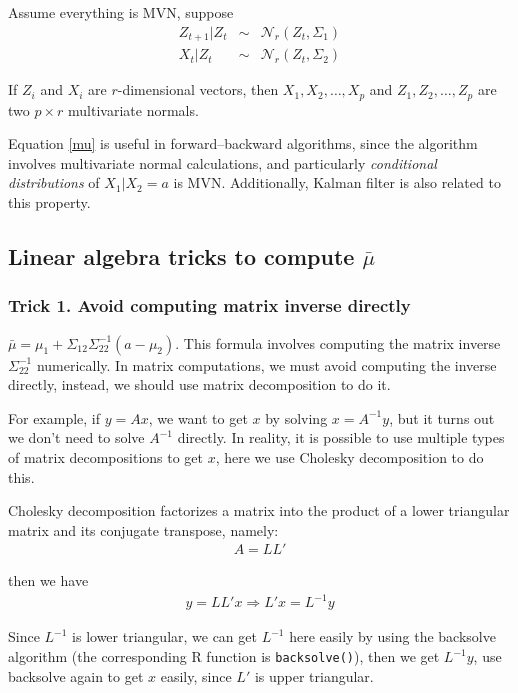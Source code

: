 \documentclass[12pt]{report}
\begin{document}
Assume everything is MVN, suppose
\begin{eqnarray}
Z_{t+1} | Z_t & \sim & \mathcal{N}_{r} (Z_t, \Sigma_1)\\
X_{t} | Z_t & \sim & \mathcal{N}_{r} (Z_t, \Sigma_2)
\end{eqnarray}

If $Z_i$ and $X_i$ are $r$-dimensional vectors, then $X_1, X_2, \ldots, X_p$ and $Z_1, Z_2, \ldots, Z_p$ are two $p \times r$ multivariate normals.

\vskip 0.1in

Equation \ref{mu} is useful in forward–backward algorithms, since the algorithm involves multivariate normal calculations, and particularly \emph{conditional distributions} of $X_1 | X_2 = a$ is MVN. Additionally, Kalman filter is also related to this property.

\subsection{Linear algebra tricks to compute $\bar{\mu}$}

\subsubsection{Trick 1. Avoid computing matrix inverse directly}

$\bar{\mu} = \mu_1 + \Sigma_{12} \Sigma_{22}^{-1} (a-\mu_2)$. This formula involves computing the matrix inverse $\Sigma_{22}^{-1}$ numerically. In matrix computations, we must avoid computing the inverse directly, instead, we should use matrix decomposition to do it.

\vskip 0.1in

For example, if $y = Ax$, we want to get $x$ by solving $x = A^{-1} y$, but it turns out we don't need to solve $A^{-1}$ directly. In reality, it is possible to use multiple types of matrix decompositions to get $x$, here we use Cholesky decomposition to do this.

Cholesky decomposition factorizes a matrix into the product of a lower triangular matrix and its conjugate transpose, namely:
\begin{eqnarray}
	A = LL'
\end{eqnarray}

then we have
\begin{eqnarray}
	y = LL' x \Rightarrow L'x = L^{-1} y
\end{eqnarray}

Since $L^{-1}$ is lower triangular, we can get $L^{-1}$ here easily by using the backsolve algorithm (the corresponding R function is \texttt{backsolve()}), then we get $L^{-1} y$, use backsolve again to get $x$ easily, since $L'$ is upper triangular.
\end{document}
